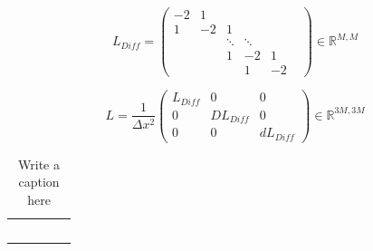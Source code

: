 \begin{equation}
    L_{Diff} = 
\begin{pmatrix}
    -2 & 1 & & & \\
    1 & -2 & 1 & \\
    & & \ddots & \ddots & & \\
    & & 1 & -2 & 1 \\
    & & & 1 & -2
 \end{pmatrix}
 \in \mathbb{R} ^ {M, M} \label{eq:Ldiff}
\end{equation}


\begin{equation}
    L = \frac{1}{\Delta x^2} 
\begin{pmatrix}
    L_{Diff} & 0 & 0 \\
    0 & DL_{Diff} & 0 \\
    0 & 0 & dL_{Diff}
 \end{pmatrix}
 \in \mathbb{R} ^ {3M, 3M} \label{eq:LMatrix}
\end{equation}

\begin{table}[h!]
    \centering
    \begin{tabularx}{0.8\textwidth} { 
      | >{\centering\arraybackslash}X 
      | >{\centering\arraybackslash}X
      | >{\centering\arraybackslash}X
      | >{\centering\arraybackslash}X
      | >{\centering\arraybackslash}X|
    }
    \hline
     &  &  \\
    \hline  &  &  \\ 
    \hline  &  &  \\ 
    \hline  &  &  \\ 
    \hline  &  &  \\
    \hline  &  &  \\ 
    \hline
    \end{tabularx}
    \caption{Write a caption here}
    \label{tab:my_label}
\end{table}


\newpage


